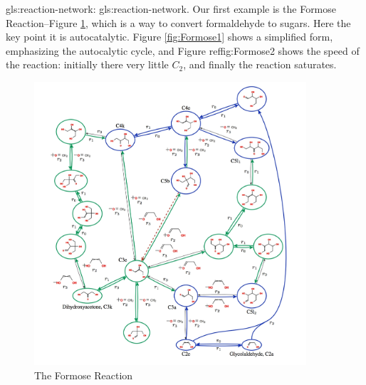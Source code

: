 \documentclass[]{article}
\begin{document}
\Gls{gls:reaction-network}: \glsdesc{gls:reaction-network}. Our first example is the Formose Reaction--Figure \ref{fig:Formose}\cite{andersen2013generic}, which is a way to convert formaldehyde to sugars. Here the key point it is autocatalytic. Figure \ref{fig:Formose1} shows a simplified form, emphasizing the autocalytic cycle, and Figure ref{fig:Formose2} shows the speed of the reaction: initially there very little $C_2$, and finally the reaction saturates.  

\begin{figure}[H]
	\caption{The Formose Reaction}\label{fig:Formose}
	\includegraphics[width=0.9\textwidth]{Formose}
\end{figure}
\end{document}
